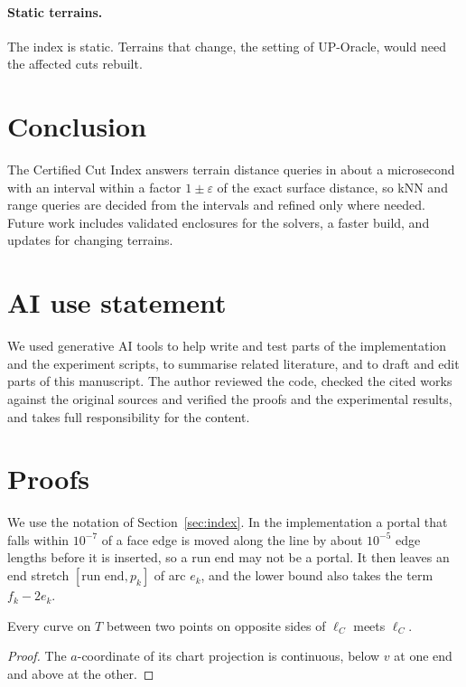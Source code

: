 \documentclass[sigconf,nonacm,screen]{acmart}
\newcommand{\eps}{\varepsilon}
\begin{document}
\paragraph{Static terrains.}
The index is static. Terrains that change, the setting of UP-Oracle, would need the affected cuts rebuilt.

\section{Conclusion}

The Certified Cut Index answers terrain distance queries in about a microsecond with an interval within a factor
$1\pm\eps$ of the exact surface distance, so kNN and range queries are decided from the intervals and refined only
where needed. Future work includes validated enclosures for the solvers, a faster build, and updates for changing
terrains.

\section*{AI use statement}
We used generative AI tools to help write and test parts of the implementation and the experiment scripts, to
summarise related literature, and to draft and edit parts of this manuscript. The author reviewed the code, checked
the cited works against the original sources and verified the proofs and the experimental results, and takes full
responsibility for the content.




\appendix

\section{Proofs}
\label{app:proofs}

We use the notation of Section~\ref{sec:index}. In the implementation a portal that falls within $10^{-7}$ of a face
edge is moved along the line by about $10^{-5}$ edge lengths before it is inserted, so a run end may not be a portal.
It then leaves an end stretch $[\text{run end},p_k]$ of arc $e_k$, and the lower bound also takes the term $f_k-2e_k$.

\begin{lemma}[crossing]
Every curve on $T$ between two points on opposite sides of $\ell_C$ meets $\ell_C$.
\end{lemma}
\begin{proof}
The $a$-coordinate of its chart projection is continuous, below $v$ at one end and above at the other.
\end{proof}
\end{document}
